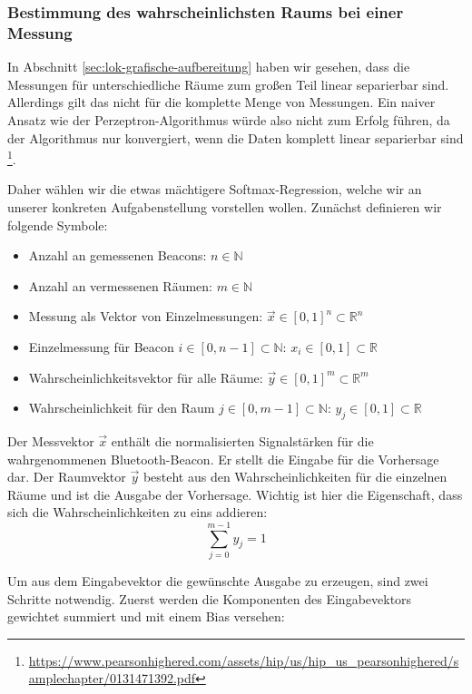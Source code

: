 \subsubsection{Bestimmung des wahrscheinlichsten Raums bei einer Messung}
\label{sec:lok-wahrscheinlich}

In Abschnitt \ref{sec:lok-grafische-aufbereitung} haben wir gesehen, dass die
Messungen für unterschiedliche Räume zum großen Teil linear separierbar sind.
Allerdings gilt das nicht für die komplette Menge von Messungen.
Ein naiver Ansatz wie der Perzeptron-Algorithmus würde also nicht zum Erfolg
führen, da der Algorithmus nur konvergiert, wenn die Daten komplett linear
separierbar sind
\footnote{\url{https://www.pearsonhighered.com/assets/hip/us/hip_us_pearsonhighered/samplechapter/0131471392.pdf}}.

Daher wählen wir die etwas mächtigere Softmax-Regression, welche wir an unserer
konkreten Aufgabenstellung vorstellen wollen.
Zunächst definieren wir folgende Symbole:
\begin{itemize}
	\item Anzahl an gemessenen Beacons: $n \in \mathbb{N}$
	\item Anzahl an vermessenen Räumen: $m \in \mathbb{N}$
	\item Messung als Vektor von Einzelmessungen: $ \vec{x} \in [0, 1]^n \subset \mathbb{R}^n $
	\item Einzelmessung für Beacon $i \in [0, n - 1] \subset \mathbb{N}$: $x_i \in [0, 1] \subset \mathbb{R}$
	\item Wahrscheinlichkeitsvektor für alle Räume: $ \vec{y} \in [0, 1]^m \subset \mathbb{R}^m$
	\item Wahrscheinlichkeit für den Raum $j \in [0, m - 1] \subset \mathbb{N}$:
		$ y_j \in [0, 1] \subset \mathbb{R} $ 
\end{itemize}

Der Messvektor $\vec{x}$ enthält die normalisierten Signalstärken für die wahrgenommenen
Bluetooth-Beacon. Er stellt die Eingabe für die Vorhersage dar. 
Der Raumvektor $\vec{y}$ besteht aus den Wahrscheinlichkeiten für die einzelnen Räume und
ist die Ausgabe der Vorhersage. Wichtig ist hier die Eigenschaft, dass sich die Wahrscheinlichkeiten
zu eins addieren:
$$ \sum_{j=0}^{m-1} y_j = 1 $$

Um aus dem Eingabevektor die gewünschte Ausgabe zu erzeugen, sind zwei Schritte notwendig.
Zuerst werden die Komponenten des Eingabevektors gewichtet summiert und mit einem Bias
versehen:

